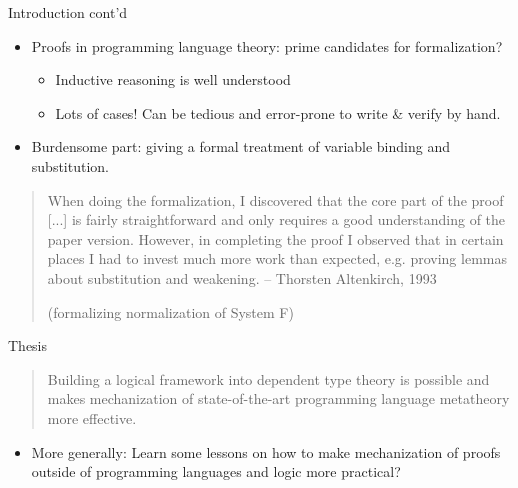 \documentclass[usenames,dvipsnames]{beamer}
\begin{document}
\begin{frame}{Introduction cont'd}
\begin{itemize}
\item Proofs in programming language theory: prime
candidates for formalization?
\begin{itemize}
\item Inductive reasoning is well understood
\item Lots of cases! Can be
tedious and error-prone to write \& verify by hand.
\end{itemize}
\pause
\item Burdensome part: giving a formal treatment of variable binding and
substitution.
\end{itemize}
\pause
\begin{quote}
When doing the formalization, I discovered that the core part of the
proof [...] is fairly straightforward and
only requires a good understanding of the paper version. However, in
completing the proof I observed that in certain places I had to invest
much more work than expected, e.g. proving lemmas about substitution
and weakening. -- Thorsten Altenkirch, 1993

   (formalizing normalization of System F)
\end{quote}
\end{frame}

\begin{frame}{Thesis}
\begin{quote}Building a logical framework into dependent type
theory is possible and makes mechanization of state-of-the-art programming
language metatheory more effective.
\end{quote}
\begin{itemize}
\pause
\item More generally: Learn some lessons on how
to make mechanization of proofs outside of programming languages and
logic more practical?
\end{itemize}
\end{frame}
\end{document}
